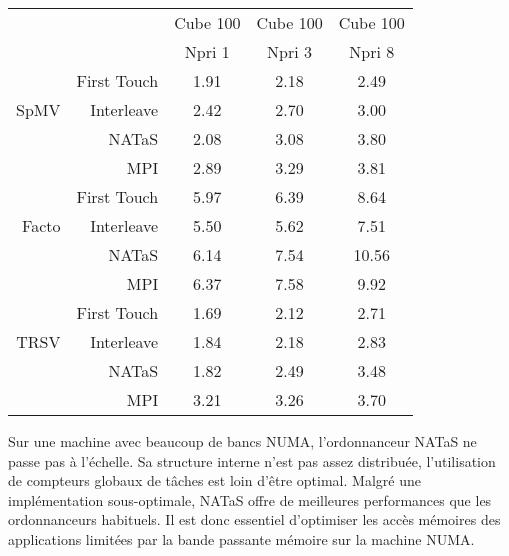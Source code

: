 \begin{center}
  \begin{tabular}{|r|r|c|c|c|}
    \hline
       & & Cube 100 & Cube 100 & Cube 100 \\
       & & Npri 1   & Npri 3   & Npri 8 \\
    \hline
&        First Touch & 1.91 & 2.18 & 2.49 \\
SpMV &   Interleave  & 2.42 & 2.70 & 3.00 \\
&        NATaS       & 2.08 & 3.08 & 3.80 \\
&        MPI         & 2.89 & 3.29 & 3.81 \\
    \hline
&        First Touch & 5.97 & 6.39 & 8.64 \\
Facto &  Interleave  & 5.50 & 5.62 & 7.51 \\
&        NATaS       & 6.14 & 7.54 & 10.56 \\
&        MPI         & 6.37 & 7.58 & 9.92 \\
    \hline
&        First Touch & 1.69 & 2.12 & 2.71 \\
TRSV &   Interleave  & 1.84 & 2.18 & 2.83 \\
&        NATaS       & 1.82 & 2.49 & 3.48 \\
&        MPI         & 3.21 & 3.26 & 3.70 \\
    \hline
  \end{tabular}
  \label{tab:rostand_sum}
\end{center}

Sur une machine avec beaucoup de bancs NUMA, l'ordonnanceur NATaS ne passe pas à l'échelle.
%
Sa structure interne n'est pas assez distribuée, l'utilisation de compteurs globaux de tâches est loin d'être optimal.
%
Malgré une implémentation sous-optimale, NATaS offre de meilleures performances que les ordonnanceurs habituels.
%
Il est donc essentiel d'optimiser les accès mémoires des applications limitées par la bande passante mémoire sur la machine NUMA.
